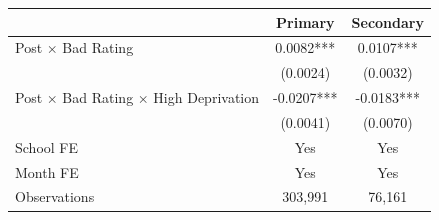 \begin{tabular}{lcc}
\toprule
 & Primary & Secondary \\
\midrule
Post $\times$ Bad Rating & 0.0082*** & 0.0107*** \\
 & (0.0024) & (0.0032) \\
Post $\times$ Bad Rating $\times$ High Deprivation & -0.0207*** & -0.0183*** \\
 & (0.0041) & (0.0070) \\
\midrule
School FE & Yes & Yes \\
Month FE & Yes & Yes \\
Observations & 303,991 & 76,161 \\
\bottomrule
\end{tabular}
